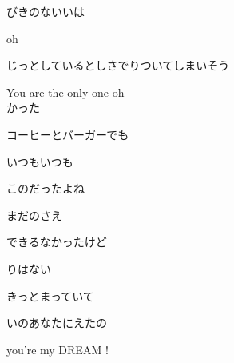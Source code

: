 {びきのないいは

oh

じっとしているとしさでりついてしまいそう

You are the only one oh
\\

かった

コーヒーとバーガーでも

いつもいつも

このだったよね

まだのさえ

できるなかったけど

りはない

きっとまっていて

いのあなたにえたの

you're my DREAM !

}